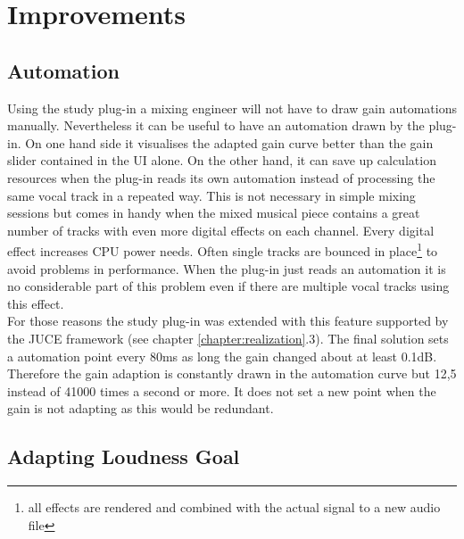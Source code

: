 \chapter{Improvements}
\label{chapter:improvements}

\section{Automation}

Using the study plug-in a mixing engineer will not have to draw gain automations manually. Nevertheless it can be useful to have an automation drawn by the plug-in. On one hand side it visualises the adapted gain curve better than the gain slider contained in the UI alone. On the other hand, it can save up calculation resources when the plug-in reads its own automation instead of processing the same vocal track in a repeated way. This is not necessary in simple mixing sessions but comes in handy when the mixed musical piece contains a great number of tracks with even more digital effects on each channel. Every digital effect increases CPU power needs. Often single tracks are bounced in place\footnote{all effects are rendered and combined with the actual signal to a new audio file} to avoid problems in performance. When the plug-in just reads an automation it is no considerable part of this problem even if there are multiple vocal tracks using this effect.\\
For those reasons the study plug-in was extended with this feature supported by the JUCE framework (see chapter \ref{chapter:realization}.3).
The final solution sets a automation point every 80ms as long the gain changed about at least 0.1dB. Therefore the gain adaption is constantly drawn in the automation curve but 12,5 instead of 41000 times a second or more. It does not set a new point when the gain is not adapting as this would be redundant.\\

\section{Adapting Loudness Goal}

